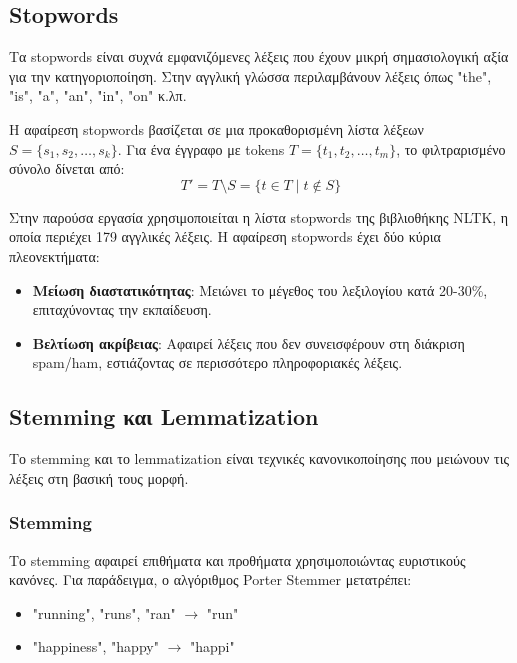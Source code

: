 \documentclass[12pt,a4paper,twoside]{book}
\begin{document}
\subsection{Stopwords}

Τα stopwords είναι συχνά εμφανιζόμενες λέξεις που έχουν μικρή σημασιολογική αξία για την κατηγοριοποίηση. Στην αγγλική γλώσσα περιλαμβάνουν λέξεις όπως "the", "is", "a", "an", "in", "on" κ.λπ.

Η αφαίρεση stopwords βασίζεται σε μια προκαθορισμένη λίστα λέξεων \(S = \{s_1, s_2, \ldots, s_k\}\). Για ένα έγγραφο με tokens \(T = \{t_1, t_2, \ldots, t_m\}\), το φιλτραρισμένο σύνολο δίνεται από:
\begin{equation}
    T' = T \setminus S = \{t \in T \mid t \notin S\}
\end{equation}

Στην παρούσα εργασία χρησιμοποιείται η λίστα stopwords της βιβλιοθήκης NLTK, η οποία περιέχει 179 αγγλικές λέξεις. Η αφαίρεση stopwords έχει δύο κύρια πλεονεκτήματα:
\begin{itemize}
    \item \textbf{Μείωση διαστατικότητας}: Μειώνει το μέγεθος του λεξιλογίου κατά 20-30\%, επιταχύνοντας την εκπαίδευση.
    \item \textbf{Βελτίωση ακρίβειας}: Αφαιρεί λέξεις που δεν συνεισφέρουν στη διάκριση spam/ham, εστιάζοντας σε περισσότερο πληροφοριακές λέξεις.
\end{itemize}

\subsection{Stemming και Lemmatization}

Το stemming και το lemmatization είναι τεχνικές κανονικοποίησης που μειώνουν τις λέξεις στη βασική τους μορφή.

\subsubsection{Stemming}

Το stemming αφαιρεί επιθήματα και προθήματα χρησιμοποιώντας ευριστικούς κανόνες. Για παράδειγμα, ο αλγόριθμος Porter Stemmer μετατρέπει:
\begin{itemize}
    \item "running", "runs", "ran" \(\rightarrow\) "run"
    \item "happiness", "happy" \(\rightarrow\) "happi"
\end{itemize}
\end{document}
